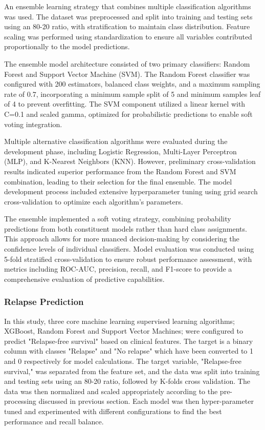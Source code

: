 \documentclass[conference]{IEEEtran}
\begin{document}
An ensemble learning strategy that combines multiple classification algorithms was used. The dataset was preprocessed and split into training and testing sets using an 80-20 ratio, with stratification to maintain class distribution. Feature scaling was performed using standardization to ensure all variables contributed proportionally to the model predictions.

The ensemble model architecture consisted of two primary classifiers: Random Forest and Support Vector Machine (SVM). The Random Forest classifier was configured with 200 estimators, balanced class weights, and a maximum sampling rate of 0.7, incorporating a minimum sample split of 5 and minimum samples leaf of 4 to prevent overfitting. The SVM component utilized a linear kernel with C=0.1 and scaled gamma, optimized for probabilistic predictions to enable soft voting integration.

Multiple alternative classification algorithms were evaluated during the development phase, including Logistic Regression, Multi-Layer Perceptron (MLP), and K-Nearest Neighbors (KNN). However, preliminary cross-validation results indicated superior performance from the Random Forest and SVM combination, leading to their selection for the final ensemble. The model development process included extensive hyperparameter tuning using grid search cross-validation to optimize each algorithm's parameters.

The ensemble implemented a soft voting strategy, combining probability predictions from both constituent models rather than hard class assignments. This approach allows for more nuanced decision-making by considering the confidence levels of individual classifiers. Model evaluation was conducted using 5-fold stratified cross-validation to ensure robust performance assessment, with metrics including ROC-AUC, precision, recall, and F1-score to provide a comprehensive evaluation of predictive capabilities.

\subsubsection{Relapse Prediction}

In this study, three core machine learning supervised learning algorithms; XGBoost, Random Forest and Support Vector Machines; were configured to predict "Relapse-free survival" based on clinical features. The target is a binary column with classes "Relapse" and "No relapse" which have been converted to 1 and 0 respectively for model calculations. The target variable, "Relapse-free survival," was separated from the feature set, and the data was split into training and testing sets using an 80-20 ratio, followed by K-folds cross validation. The data was then normalized and scaled appropriately according to the pre-processing discussed in previous section. Each model was then hyper-parameter tuned and experimented with different configurations to find the best performance and recall balance.
\end{document}
